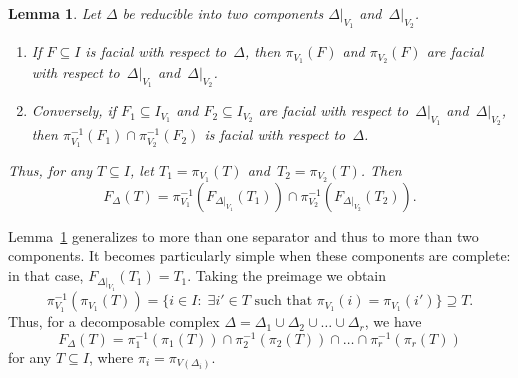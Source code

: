 \documentclass[aos,noinfoline]{imsart}
\newcommand{\face}{F}
\newtheorem{lemma}[theorem]{Lemma}
\theoremstyle{remark}
\theoremstyle{definition}
\begin{document}
\begin{lemma}
  \label{lem:reducible-facial}
  Let $\Delta$ be reducible into two components  $\Delta|_{V_{1}}$ and~$\Delta|_{V_{2}}$.
  \begin{enumerate}
  \item If $F\subseteq I$ is facial with respect to~$\Delta$, then $\pi_{V_{1}}(F)$ and $\pi_{V_{2}}(F)$ are facial with
    respect to~$\Delta|_{V_{1}}$ and~$\Delta|_{V_{2}}$.
  \item Conversely, if $F_{1}\subseteq I_{V_{1}}$ and $F_{2}\subseteq I_{V_{2}}$ are facial with respect
    to~$\Delta|_{V_{1}}$ and~$\Delta|_{V_{2}}$, then $\pi_{V_{1}}^{-1}(F_{1})\cap\pi_{V_{2}}^{-1}(F_{2})$ is facial with
    respect to~$\Delta$.
  \end{enumerate}
  Thus, for any $T\subseteq I$, let $T_{1}=\pi_{V_{1}}(T)$ and~$T_{2}=\pi_{V_{2}}(T)$.  Then
    \begin{equation*}
      \face_{\Delta}(T) = \pi_{V_{1}}^{-1}(\face_{\Delta|_{V_{1}}}(T_{1})) \cap \pi_{V_{2}}^{-1}(\face_{\Delta|_{V_{2}}}(T_{2})).
    \end{equation*}
\end{lemma}

Lemma~\ref{lem:reducible-facial} generalizes to more than one separator and thus to more than two components.  It
becomes particularly simple when these components are complete: in that case, $\face_{\Delta|_{V_{1}}}(T_{1})=T_1$.
Taking the preimage we obtain
\begin{equation*}
\pi_{V_1}^{-1}(\pi_{V_1}(T))=\big\{i\in I:\;\exists i'\in T\text{ such that }\pi_{V_1}(i)=\pi_{V_1}(i')\big\} \supseteq T.
\end{equation*}
Thus, for a decomposable complex $\Delta=\Delta_{1}\cup\Delta_{2}\cup\dots\cup\Delta_{r}$,
we have
\begin{equation}
  \label{eq:decomposable}
  \face_{\Delta}(T) = \pi_{1}^{-1}(\pi_{1}(T)) \cap \pi_{2}^{-1}(\pi_{2}(T)) \cap\dots\cap \pi_{r}^{-1}(\pi_{r}(T))
\end{equation}
for any $T\subseteq I$, where $\pi_{i}=\pi_{V(\Delta_{i})}$.
\end{document}
